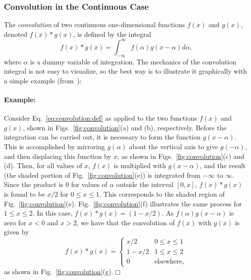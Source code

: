 \subsubsection{Convolution in the Continuous Case}

The {\em convolution\/} of two continuous one-dimensional functions
$f(x)$ and $g(x)$, denoted $f(x)\ast g(x)$, is defined by the integral
\begin{equation}
\label{eq:convolution:def}
  f(x)\ast g(x)=\int_{-\infty}^{\infty}f(\alpha)g(x-\alpha)d\alpha\mbox{,}
\end{equation}
where $\alpha$ is a dummy variable of integration.  The mechanics of
the convolution integral is not easy to visualize, so the best way is
to illustrate it graphically with a simple example
(from~\cite{digim}):

\paragraph{Example:} Consider Eq.~\ref{eq:convolution:def} as applied
to the two functions $f(x)$ and $g(x)$, shown in
Figs.~\ref{fig:convolution}(a) and (b), respectively.  Before the
integration can be carried out, it is necessary to form the function
$g(x-\alpha)$.  This is accomplished by mirroring $g(\alpha)$ about
the vertical axis to give $g(-\alpha)$, and then displacing this
function by $x$, as shown in Figs.~\ref{fig:convolution}(c) and (d).
Then, for all values of $x$, $f(x)$ is multiplied with $g(x-\alpha)$,
and the result (the shaded portion of Fig.~\ref{fig:convolution}(e))
is integrated from $-\infty$ to $\infty$.  Since the product is $0$
for values of $\alpha$ outside the interval $[0,x]$, $f(x)\ast g(x)$
is found to be $x/2$ for $0\leq x\leq 1$.  This corresponds to the
shaded region of Fig.~\ref{fig:convolution}(e).
Fig.~\ref{fig:convolution}(f) illustrates the same process for $1\leq
x\leq 2$.  In this case, $f(x)\ast g(x)=(1-x/2)$.  As
$f(\alpha)g(x-\alpha)$ is zero for $x<0$ and $x>2$, we have that the
convolution of $f(x)$ with $g(x)$ is given by
\begin{equation}
  f(x)\ast g(x)=\left\{\begin{array}{ll}
                         x/2   & 0\leq x\leq 1 \\
                         1-x/2 & 1\leq x\leq 2 \\
                         0     & \mbox{elsewhere,}
                       \end{array}\right.
\end{equation}
as shown in Fig.~\ref{fig:convolution}(g).\hfill$\Box$
\vspace*{0.5cm}

